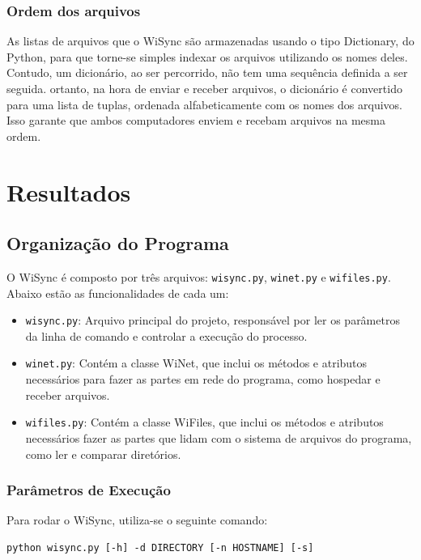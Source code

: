 \documentclass[12pt,a4paper]{ufpr}
\begin{document}
\subsection{Ordem dos arquivos}
As listas de arquivos que o WiSync são armazenadas usando o tipo Dictionary, do Python, para que torne-se simples indexar os arquivos utilizando os nomes deles.
Contudo, um dicionário, ao ser percorrido, não tem uma sequência definida a ser seguida. 
ortanto, na hora de enviar e receber arquivos, o dicionário é convertido para uma lista de tuplas, ordenada alfabeticamente com os nomes dos arquivos.
Isso garante que ambos computadores enviem e recebam arquivos na mesma ordem.


\chapter{Resultados}
\label{resultados}

\section{Organização do Programa}
O WiSync é composto por três arquivos: \texttt{wisync.py}, \texttt{winet.py} e \texttt{wifiles.py}. Abaixo estão as funcionalidades de cada um:
\begin{itemize}
  \item \texttt{wisync.py}: Arquivo principal do projeto, responsável por ler os parâmetros da linha de comando e controlar a execução do processo.
  \item \texttt{winet.py}: Contém a classe WiNet, que inclui os métodos e atributos necessários para fazer as partes em rede do programa, como hospedar e receber arquivos.
  \item \texttt{wifiles.py}: Contém a classe WiFiles, que inclui os métodos e atributos necessários fazer as partes que lidam com o sistema de arquivos do programa, como ler e comparar diretórios.
\end{itemize}

\subsection{Parâmetros de Execução}

Para rodar o WiSync, utiliza-se o seguinte comando:
\begin{verbatim}
python wisync.py [-h] -d DIRECTORY [-n HOSTNAME] [-s]
\end{verbatim}
\end{document}

